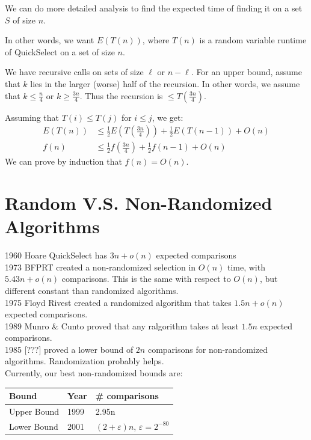                 We can do more detailed analysis to find the expected time of finding it on a set $S$ of size $n$.

                In other words, we want $E(T(n))$, where $T(n)$ is a random variable runtime of QuickSelect on a set of size $n$.

                We have recursive calls on sets of size $\ell$ or $n - \ell$.
                For an upper bound, assume that $k$ lies in the larger (worse) half of the recursion.
                In other words, we assume that $k \le \frac{n}{4}$ or $k \ge \frac{3n}{4}$.
                Thus the recursion is $\le T(\frac{3n}{4})$.

                Assuming that $T(i) \le T(j)$ for $i \le j$, we get:
                \begin{align*}
                    E(T(n)) &\le \frac{1}{2}E\left(T\left(\frac{3n}{4}\right)\right) + \frac{1}{2}E\left(T\left(n - 1\right)\right) + O(n) \\
                    f\left(n\right) &\le \frac{1}{2}f\left(\frac{3n}{4}\right) + \frac{1}{2}f\left(n - 1\right) + O(n)
                \end{align*}
                We can prove by induction that $f(n) = O(n)$.
            \section{Random V.S. Non-Randomized Algorithms} %
            \label{sec:random_v_s_non_randomized_algorithms}
                1960 Hoare QuickSelect has $3n + o(n)$ expected comparisons \\
                1973 BFPRT created a non-randomized selection in $O(n)$ time, with $5.43n + o(n)$ comparisons. This is the same with respect to $O(n)$, but different constant than randomized algorithms. \\
                1975 Floyd Rivest created a randomized algorithm that takes $1.5n + o(n)$ expected comparisons. \\
                1989 Munro \& Cunto proved that any ralgorithm takes at least $1.5n$ expected comparisons. \\
                1985 [???] proved a lower bound of $2n$ comparisons for non-randomized algorithms. Randomization probably helps. \\

                Currently, our best non-randomized bounds are:
                \begin{table}[h]
                    \centering
                    \begin{tabular}{ | l | l | l |}
                        \hline
                        Bound & Year & \# comparisons \\ \hline \hline
                        Upper Bound & 1999 & 2.95n \\ \hline
                        Lower Bound & 2001 & $(2 + \varepsilon) n$, $\varepsilon = 2^{-80}$ \\ \hline
                    \end{tabular}
                \end{table}
